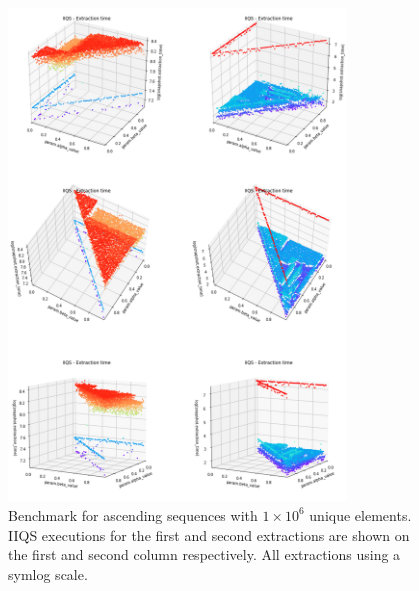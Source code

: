 \begin{figure}[p]
    \centering
    \includegraphics[width=0.8\textwidth]{./fragments/04_experimental_execution/images/04_alphabeta_singleclass_asc.png}
    \caption{Benchmark for ascending sequences with $1\times10^6$ unique elements. IIQS executions for the first and second extractions are shown on the first and second column respectively. All extractions using a symlog scale.}
    \label{FIG:05_ALPHABETA_RELATIONSHIP_ASC}
\end{figure}

